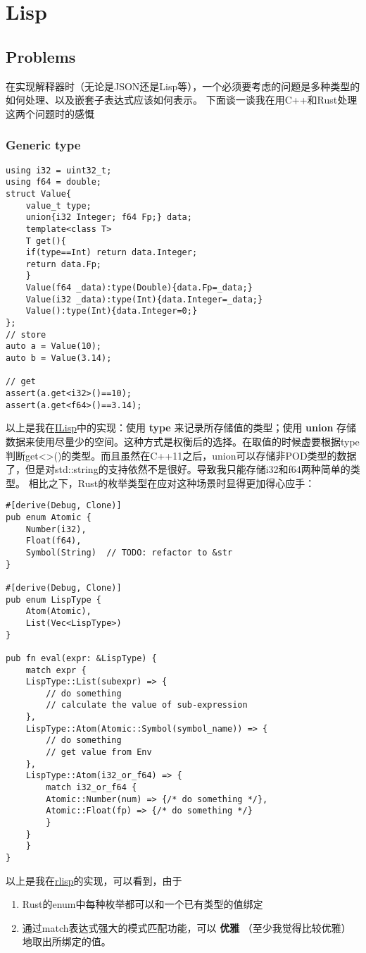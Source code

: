 \documentclass[11pt]{article}
\author{于承业}
\date{\today}
\title{}
\begin{document}
\tableofcontents

\section{Lisp}
\label{sec:orgd3d41e7}
\subsection{Problems}
\label{sec:org14930c9}
在实现解释器时（无论是JSON还是Lisp等），一个必须要考虑的问题是多种类型的如何处理、以及嵌套子表达式应该如何表示。
下面谈一谈我在用C++和Rust处理这两个问题时的感慨
\subsubsection{Generic type}
\label{sec:orge336e53}
\label{org7e21ac2}
\begin{verbatim}
using i32 = uint32_t;
using f64 = double;
struct Value{
    value_t type;
    union{i32 Integer; f64 Fp;} data;
    template<class T>
    T get(){
	if(type==Int) return data.Integer;
	return data.Fp;
    }
    Value(f64 _data):type(Double){data.Fp=_data;}
    Value(i32 _data):type(Int){data.Integer=_data;}
    Value():type(Int){data.Integer=0;}
};
// store
auto a = Value(10);
auto b = Value(3.14);

// get
assert(a.get<i32>()==10);
assert(a.get<f64>()==3.14);
\end{verbatim}
以上是我在\href{https://github.com/kabu1204/ILisp}{ILisp}中的实现：使用 \textbf{\textbf{type}} 来记录所存储值的类型；使用 \textbf{\textbf{union}} 存储数据来使用尽量少的空间。这种方式是权衡后的选择。在取值的时候虚要根据type判断get<>()的类型。而且虽然在C++11之后，union可以存储非POD类型的数据了，但是对std::string的支持依然不是很好。导致我只能存储i32和f64两种简单的类型。
相比之下，Rust的枚举类型在应对这种场景时显得更加得心应手：
\label{org135d774}
\begin{verbatim}
#[derive(Debug, Clone)]
pub enum Atomic {
    Number(i32),
    Float(f64),
    Symbol(String)  // TODO: refactor to &str
}

#[derive(Debug, Clone)]
pub enum LispType {
    Atom(Atomic),
    List(Vec<LispType>)
}

pub fn eval(expr: &LispType) {
    match expr {
	LispType::List(subexpr) => {
	    // do something
	    // calculate the value of sub-expression
	},
	LispType::Atom(Atomic::Symbol(symbol_name)) => {
	    // do something
	    // get value from Env
	},
	LispType::Atom(i32_or_f64) => {
	    match i32_or_f64 {
		Atomic::Number(num) => {/* do something */},
		Atomic::Float(fp) => {/* do something */}
	    }
	}
    }
}
\end{verbatim}
以上是我在\href{https://github.com/kabu1204/rlisp}{rlisp}的实现，可以看到，由于
\begin{enumerate}
\item Rust的enum中每种枚举都可以和一个已有类型的值绑定
\item 通过match表达式强大的模式匹配功能，可以 \textbf{\textbf{优雅}} （至少我觉得比较优雅） 地取出所绑定的值。
\end{enumerate}
\end{document}
